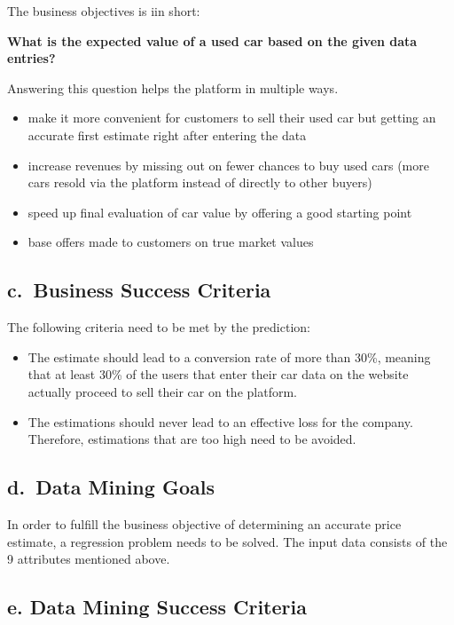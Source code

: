 \documentclass[sigchi]{acmart}
\def\tightlist{}
\begin{document}
The business objectives is iin short:

\textbf{What is the expected value of a used car based on the given data entries?}

Answering this question helps the platform in multiple ways.

\begin{itemize}
\tightlist
\item
  make it more convenient for customers to sell their used car but getting an accurate first estimate right after entering the data
\item
  increase revenues by missing out on fewer chances to buy used cars (more cars resold via the platform instead of directly to other buyers)
\item
  speed up final evaluation of car value by offering a good starting point
\item
  base offers made to customers on true market values
\end{itemize}

\hypertarget{c.-business-success-criteria}{%
\subsection{c.~Business Success Criteria}\label{c.-business-success-criteria}}

The following criteria need to be met by the prediction:

\begin{itemize}
\item
  The estimate should lead to a conversion rate of more than 30\%, meaning that at least 30\% of the users that enter their car data on the website actually proceed to sell their car on the platform.
\item
  The estimations should never lead to an effective loss for the company. Therefore, estimations that are too high need to be avoided.
\end{itemize}

\hypertarget{d.-data-mining-goals}{%
\subsection{d.~Data Mining Goals}\label{d.-data-mining-goals}}

In order to fulfill the business objective of determining an accurate price estimate, a regression problem needs to be solved. The input data consists of the 9 attributes mentioned above.

\hypertarget{e.-data-mining-success-criteria}{%
\subsection{e. Data Mining Success Criteria}\label{e.-data-mining-success-criteria}}
\end{document}

